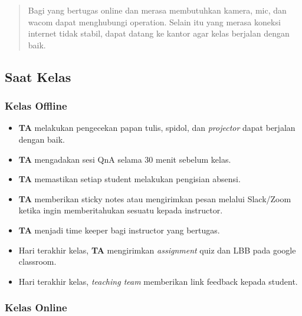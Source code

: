 \documentclass[
]{book}
\providecommand{\tightlist}{%
  \setlength{\itemsep}{0pt}\setlength{\parskip}{0pt}}
\begin{document}
\begin{quote}
Bagi yang bertugas online dan merasa membutuhkan kamera, mic, dan wacom dapat menghubungi operation. Selain itu yang merasa koneksi internet tidak stabil, dapat datang ke kantor agar kelas berjalan dengan baik.
\end{quote}

\hypertarget{saat-kelas}{%
\subsection{Saat Kelas}\label{saat-kelas}}

\hypertarget{kelas-offline-1}{%
\subsubsection{Kelas Offline}\label{kelas-offline-1}}

\begin{itemize}
\tightlist
\item
  \textbf{TA} melakukan pengecekan papan tulis, spidol, dan \emph{projector} dapat berjalan dengan baik.
\item
  \textbf{TA} mengadakan sesi QnA selama 30 menit sebelum kelas.
\item
  \textbf{TA} memastikan setiap student melakukan pengisian absensi.
\item
  \textbf{TA} memberikan sticky notes atau mengirimkan pesan melalui Slack/Zoom ketika ingin memberitahukan sesuatu kepada instructor.
\item
  \textbf{TA} menjadi time keeper bagi instructor yang bertugas.
\item
  Hari terakhir kelas, \textbf{TA} mengirimkan \emph{assignment} quiz dan LBB pada google classroom.
\item
  Hari terakhir kelas, \emph{teaching team} memberikan link feedback kepada student.
\end{itemize}

\hypertarget{kelas-online-1}{%
\subsubsection{Kelas Online}\label{kelas-online-1}}
\end{document}
